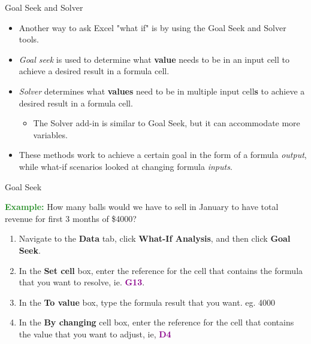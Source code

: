 \documentclass[xcolor=svgnames]{beamer}
\newcommand{\cell}[1]{{\sf \textbf{\textcolor{DarkMagenta}{#1}}}}
\begin{document}
\begin{frame}{Goal Seek and Solver}
\begin{itemize}

\item Another way to ask Excel "what if" is by using the Goal Seek and Solver tools. \\
\medskip
\item \emph{Goal seek} %
 is used to determine what {\bf value} needs to be in an input cell to achieve a desired result in a formula cell.  \\
 \medskip
\item  \emph{Solver} determines what {\bf values} need to be in multiple input cell{\bf s} to achieve a desired result in a formula cell.  
\begin{itemize}
\item The Solver add-in is similar to Goal Seek, but it can accommodate more variables.
\end{itemize}

\medskip
\item These methods work to achieve a certain goal in the form of a formula \textit{output}, while what-if scenarios looked at changing formula \textit{inputs}.
\end{itemize}
\end{frame}


\begin{frame}{Goal Seek}
\begin{exampleblock}
{}\textcolor{ForestGreen}{\bf Example:} How many balls would we have to sell in January to have total revenue for first 3 months of \$4000?  
\end{exampleblock}
 \begin{enumerate}
 \item Navigate to the {\bf Data} tab, click {\bf What-If Analysis}, and then click {\bf Goal Seek}.
 \item In the {\bf Set cell} box, enter the reference for the cell that contains the formula that you want to resolve, ie. \cell{G13}.

\item In the {\bf To value} box, type the formula result that you want. eg. 4000

\item In the {\bf By changing} cell box, enter the reference for the cell that contains the value that you want to adjust, ie, \cell{D4}
 \end{enumerate}

 \end{frame}
\end{document}
